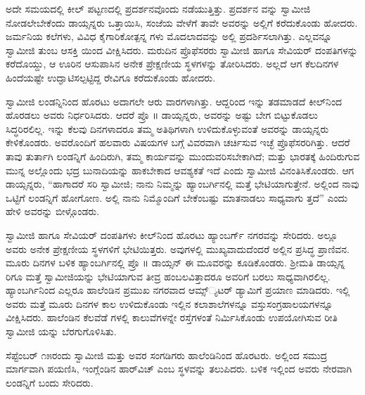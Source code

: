 ಅದೇ ಸಮಯದಲ್ಲಿ ಕೀಲ್ ಪಟ್ಟಣದಲ್ಲಿ ಪ್ರದರ್ಶನವೊಂದು ನಡೆಯುತ್ತಿತ್ತು. ಪ್ರದರ್ಶನ ವನ್ನು ಸ್ವಾಮೀಜಿ ನೋಡಲೇಬೇಕೆಂದು ಡಾಯ್ಸನ್ನರು ಒತ್ತಾಯಿಸಿ, ಸಂಜೆಯ ವೇಳೆಗೆ ತಾವೇ ಅವರನ್ನು ಅಲ್ಲಿಗೆ ಕರೆದುಕೊಂಡು ಹೋದರು. ಜರ್ಮನಿಯ ಕಲೆಗಳು, ವಿವಿಧ ಕೈಗಾರಿಕೋತ್ಪನ್ನ ಗಳು ಮೊದಲಾದವನ್ನು ಅಲ್ಲಿ ಪ್ರದರ್ಶಿಸಲಾಗಿತ್ತು. ಎಲ್ಲವನ್ನೂ ಸ್ವಾಮೀಜಿ ತುಂಬ ಆಸಕ್ತಿ ಯಿಂದ ವೀಕ್ಷಿಸಿದರು. ಮರುದಿನ ಪ್ರೊಫೆಸರರು ಸ್ವಾಮೀಜಿ ಹಾಗೂ ಸೇವಿಯರ್ ದಂಪತಿಗಳನ್ನು ಕರೆದೊಯ್ದು, ಆ ಊರಿನ ಆಸುಪಾಸಿನ ಅನೇಕ ಪ್ರೇಕ್ಷಣೀಯ ಸ್ಥಳಗಳನ್ನು ತೋರಿಸಿದರು. ಅಲ್ಲದೆ ಆಗ ಕೆಲದಿನಗಳ ಹಿಂದೆಯಷ್ಟೇ ಉದ್ಘಾಟಿಸಲ್ಪಟ್ಟಿದ್ದ ರೇವಿಗೂ ಕರೆದುಕೊಂಡು ಹೋದರು.

ಸ್ವಾಮೀಜಿ ಲಂಡನ್ನಿನಿಂದ ಹೊರಟು ಅದಾಗಲೇ ಆರು ವಾರಗಳಾಗಿತ್ತು. ಆದ್ದರಿಂದ ಇನ್ನು ತಡಮಾಡದೆ ಕೀಲ್​ನಿಂದ ಹೊರಡಲು ಅವರು ನಿರ್ಧರಿಸಿದರು. ಆದರೆ ಪ್ರೊ ॥ ಡಾಯ್ಸನ್ನರು, ಅವರನ್ನು ಅಷ್ಟು ಬೇಗ ಬಿಟ್ಟುಕೊಡಲು ಸಿದ್ಧರಿರಲಿಲ್ಲ. ಇನ್ನು ಕೆಲವು ದಿನಗಳಾದರೂ ತಮ್ಮ ಅತಿಥಿಗಳಾಗಿ ಉಳಿದುಕೊಳ್ಳುವಂತೆ ಅವರನ್ನು ಡಾಯ್ಸನ್ನರು ಕೇಳಿಕೊಂಡರು. ಅವರೊಂದಿಗೆ ಹಲವಾರು ವಿಷಯಗಳ ಬಗ್ಗೆ ವಿವರವಾಗಿ ಚರ್ಚಿಸುವ ಇಚ್ಛೆ ಪ್ರೊಫೆಸರರಿಗಿತ್ತು. ಆದರೆ ತಾವು ತುರ್ತಾಗಿ ಲಂಡನ್ನಿಗೆ ಹಿಂದಿರುಗಿ, ತಮ್ಮ ಕಾರ್ಯವನ್ನು ಮುಂದುವರಿಸಬೇಕಾಗಿದೆ; ಮತ್ತು ಭಾರತಕ್ಕೆ ಹಿಂದಿರುಗುವ ಮುನ್ನ ಅಲ್ಲೊಂದು ಭದ್ರ ಬುನಾದಿಯನ್ನು ಹಾಕಬೇಕಾದ ಆವಶ್ಯಕತೆ ಇದೆ ಎಂದು ಸ್ವಾಮೀಜಿ ವಿನಂತಿಸಿಕೊಂಡರು. ಆಗ ಡಾಯ್ಸನ್ನರು, “ಹಾಗಾದರೆ ಸರಿ ಸ್ವಾಮೀಜಿ; ನಾನು ನಿಮ್ಮನ್ನು ಹ್ಯಾಂಬರ್ಗಿನಲ್ಲಿ ಮತ್ತೆ ಭೇಟಿಯಾಗುತ್ತೇನೆ. ಅಲ್ಲಿಂದ ನಾವು ಒಟ್ಟಿಗೆ ಲಂಡನ್ನಿಗೆ ಹೋಗೋಣ. ಅಲ್ಲಿ ನಾನು ನಿಮ್ಮೊಂದಿಗೆ ಬೇಕೆಂಬಷ್ಟು ಮಾತನಾಡಲು ಸಾಧ್ಯವಾಗು ತ್ತದೆ” ಎಂದು ಹೇಳಿ ಅವರನ್ನು ಬೀಳ್ಗೊಂಡರು.

ಸ್ವಾಮೀಜಿ ಹಾಗೂ ಸೇವಿಯರ್ ದಂಪತಿಗಳು ಕೀಲ್​ನಿಂದ ಹೊರಟು ಹ್ಯಾಂಬರ್ಗ್ ನಗರವನ್ನು ಸೇರಿದರು. ಅಲ್ಲೂ ಅವರು ಅನೇಕ ಪ್ರೇಕ್ಷಣೀಯ ಸ್ಥಳಗಳಿಗೆ ಭೇಟಿಯಿತ್ತರು. ಅವುಗಳಲ್ಲಿ ಮುಖ್ಯವಾದುದೆಂದರೆ ಅಲ್ಲಿನ ಪ್ರಸಿದ್ಧ ಪ್ರಾಣಿವನ. ಮೂರು ದಿನಗಳ ಬಳಿಕ ಹ್ಯಾಂಬರ್ಗಿನಲ್ಲಿ ಪ್ರೊ ॥ ಡಾಯ್ಸನ್ ಈ ಮೂವರನ್ನು ಕೂಡಿಕೊಂಡರು. ಶ್ರೀಮತಿ ಡಾಯ್ಸನ್ನ ರಿಗೂ ಮತ್ತೆ ಸ್ವಾಮೀಜಿಯನ್ನು ಭೇಟಿಯಾಗುವ ತೀವ್ರ ಹಂಬಲವಿತ್ತಾದರೂ ಅವರಿಗೆ ಬರಲು ಸಾಧ್ಯವಾಗಿರಲಿಲ್ಲ. ಹ್ಯಾಂಬರ್ಗಿನಿಂದ ಎಲ್ಲರೂ ಹಾಲೆಂಡಿನ ಪ್ರಮುಖ ನಗರವಾದ ಆಮ್ಸ್​್ಯಟರ್ ಡ್ಯಾಮಿಗೆ ಪ್ರಯಾಣ ಮಾಡಿದರು. ಇಲ್ಲಿ ಅವರು ಮತ್ತೆ ಮೂರು ದಿನಗಳ ಕಾಲ ಉಳಿದುಕೊಂಡು ಇಲ್ಲಿನ ಕಲಾಶಾಲೆಗಳನ್ನೂ ವಸ್ತುಸಂಗ್ರಹಾಲಯಗಳನ್ನೂ ವೀಕ್ಷಿಸಿದರು. ಹಾಲೆಂಡಿನ ಕೆಲವೆಡೆ ಗಳಲ್ಲಿ ಕಾಲುವೆಗಳನ್ನೇ ರಸ್ತೆಗಳಂತೆ ನಿರ್ಮಿಸಿಕೊಂಡು ಉಪಯೋಗಿಸುವ ರೀತಿ ಸ್ವಾಮೀಜಿ ಯನ್ನು ಬೆರಗುಗೊಳಿಸಿತು.

ಸೆಪ್ಟೆಂಬರ್ ೧೫ರಂದು ಸ್ವಾಮೀಜಿ ಮತ್ತು ಅವರ ಸಂಗಡಿಗರು ಹಾಲೆಂಡಿನಿಂದ ಹೊರಟರು. ಅಲ್ಲಿಂದ ಸಮುದ್ರ ಮಾರ್ಗವಾಗಿ ಪಯಣಿಸಿ, ಇಂಗ್ಲೆಂಡಿನ ಹಾರ್​ವಿಚ್ ಎಂಬ ಸ್ಥಳವನ್ನು ತಲುಪಿದರು. ಬಳಿಕ ಇಲ್ಲಿಂದ ಅವರು ನೇರವಾಗಿ ಲಂಡನ್ನಿಗೆ ಬಂದು ಸೇರಿದರು.

